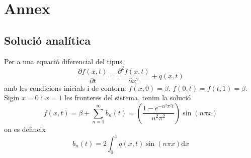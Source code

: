\documentclass{article}
\begin{document}
\section{Annex}\label{Annex I}
\subsection{Solució analítica}
Per a una equació diferencial del tipus
\begin{equation*}
    \frac{\partial f(x,t)}{\partial t} = \frac{\partial^2 f(x,t)}{\partial x^2} + q(x,t)
\end{equation*}
amb les condicions inicials i de contorn: $f(x,0) = \beta$, $f(0,t)=f(t,1)= \beta$. Sigin $x=0$ i $x=1$ les fronteres del sistema, tenim la solució
\begin{equation*}
    f(x,t) = \beta +\sum_{n=1}^{\infty} b_n(t) = \left( \frac{1-e^{-n^2\pi^2t}}{n^2\pi^2}\right)\sin{(n\pi x)}
\end{equation*}
on es defineix
\begin{equation*}
    b_n(t) = 2\int_{0}^{1} q(x,t)\sin{(n\pi x)}\text{d}x
\end{equation*}
 

\end{document}

